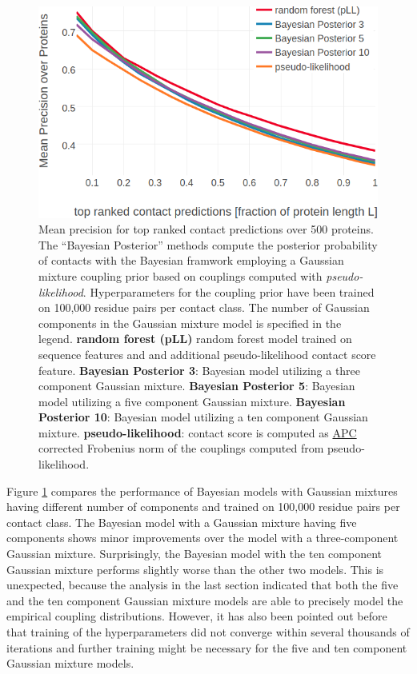 \documentclass[11pt,a4paper,twoside]{book}
\theoremstyle{definition}
\theoremstyle{definition}
\theoremstyle{remark}
\begin{document}
\begin{figure}

{\centering \includegraphics[width=0.9\linewidth]{img/bayesian_model/benchmark/precision_vs_rank_pll_100k_allcomponents} 

}

\caption{Mean precision for top
ranked contact predictions over 500 proteins. The ``Bayesian Posterior''
methods compute the posterior probability of contacts with the Bayesian
framwork employing a Gaussian mixture coupling prior based on couplings
computed with \emph{pseudo-likelihood}. Hyperparameters for the coupling
prior have been trained on 100,000 residue pairs per contact class. The
number of Gaussian components in the Gaussian mixture model is specified
in the legend. \textbf{random forest (pLL)} random forest model trained
on sequence features and and additional pseudo-likelihood contact score
feature. \textbf{Bayesian Posterior 3}: Bayesian model utilizing a three
component Gaussian mixture. \textbf{Bayesian Posterior 5}: Bayesian
model utilizing a five component Gaussian mixture. \textbf{Bayesian
Posterior 10}: Bayesian model utilizing a ten component Gaussian
mixture. \textbf{pseudo-likelihood}: contact score is computed as
\protect\hyperlink{abbrev}{APC} corrected Frobenius norm of the
couplings computed from pseudo-likelihood.}\label{fig:precision-bayesian-model-pll-100k}
\end{figure}

Figure \ref{fig:precision-bayesian-model-pll-100k} compares the
performance of Bayesian models with Gaussian mixtures having different
number of components and trained on 100,000 residue pairs per contact
class. The Bayesian model with a Gaussian mixture having five components
shows minor improvements over the model with a three-component Gaussian
mixture. Surprisingly, the Bayesian model with the ten component
Gaussian mixture performs slightly worse than the other two models. This
is unexpected, because the analysis in the last section indicated that
both the five and the ten component Gaussian mixture models are able to
precisely model the empirical coupling distributions. However, it has
also been pointed out before that training of the hyperparameters did
not converge within several thousands of iterations and further training
might be necessary for the five and ten component Gaussian mixture
models.
\end{document}
